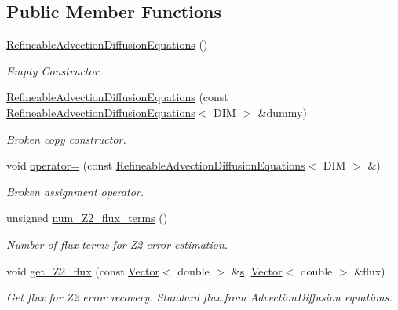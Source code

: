 \subsection*{Public Member Functions}
\begin{DoxyCompactItemize}
\item 
\hyperlink{classoomph_1_1RefineableAdvectionDiffusionEquations_afb6628e15e162ae937f35fb88c345cbb}{Refineable\+Advection\+Diffusion\+Equations} ()
\begin{DoxyCompactList}\small\item\em Empty Constructor. \end{DoxyCompactList}\item 
\hyperlink{classoomph_1_1RefineableAdvectionDiffusionEquations_a1ee8dc50b30ebc4bb1aee7635dcde89f}{Refineable\+Advection\+Diffusion\+Equations} (const \hyperlink{classoomph_1_1RefineableAdvectionDiffusionEquations}{Refineable\+Advection\+Diffusion\+Equations}$<$ D\+IM $>$ \&dummy)
\begin{DoxyCompactList}\small\item\em Broken copy constructor. \end{DoxyCompactList}\item 
void \hyperlink{classoomph_1_1RefineableAdvectionDiffusionEquations_aad3eeaeb0c18b6723939e7654541bfb2}{operator=} (const \hyperlink{classoomph_1_1RefineableAdvectionDiffusionEquations}{Refineable\+Advection\+Diffusion\+Equations}$<$ D\+IM $>$ \&)
\begin{DoxyCompactList}\small\item\em Broken assignment operator. \end{DoxyCompactList}\item 
unsigned \hyperlink{classoomph_1_1RefineableAdvectionDiffusionEquations_a19d216ae9ab2602a9da97babe7b66c21}{num\+\_\+\+Z2\+\_\+flux\+\_\+terms} ()
\begin{DoxyCompactList}\small\item\em Number of \textquotesingle{}flux\textquotesingle{} terms for Z2 error estimation. \end{DoxyCompactList}\item 
void \hyperlink{classoomph_1_1RefineableAdvectionDiffusionEquations_ae28af2d25f78d02a4cbe6b382dcc9546}{get\+\_\+\+Z2\+\_\+flux} (const \hyperlink{classoomph_1_1Vector}{Vector}$<$ double $>$ \&\hyperlink{cfortran_8h_ab7123126e4885ef647dd9c6e3807a21c}{s}, \hyperlink{classoomph_1_1Vector}{Vector}$<$ double $>$ \&flux)
\begin{DoxyCompactList}\small\item\em Get \textquotesingle{}flux\textquotesingle{} for Z2 error recovery\+: Standard flux.\+from Advection\+Diffusion equations. \end{DoxyCompactList}\item 

\end{DoxyCompactItemize}
